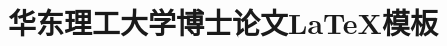 \documentclass[twoside, doctor, openany]{ecust_thesis}
\theoremstyle{definition}
\begin{document}

\title{华东理工大学博士论文LaTeX模板}
\englishauthor{}

% 
% 
% 
% 
% 
% 
% 
% 
% 

\frontmatter



\tableofcontents
\cleardoublepage %


\mainmatter








\appendix
\renewcommand\theequation{\Alph{chapter}--\arabic{equation}}  %
\renewcommand\thefigure{\Alph{chapter}--\arabic{figure}}
\renewcommand\thetable{\Alph{chapter}--\arabic{table}}
%

\backmatter




% 
\end{document}
